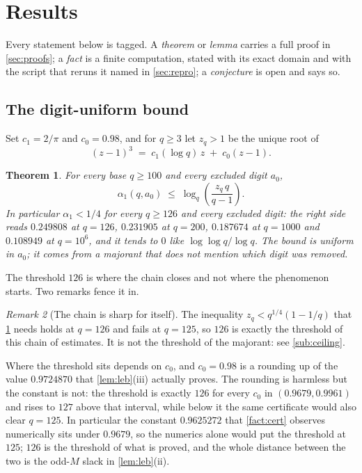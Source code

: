 \documentclass[11pt]{amsart}
\newtheorem{theorem}{Theorem}[section]
\theoremstyle{definition}
\theoremstyle{remark}
\newtheorem{remark}[theorem]{Remark}
\begin{document}
\section{Results}
\label{sec:results}

Every statement below is tagged. A \emph{theorem} or \emph{lemma} carries a full proof in \cref{sec:proofs}; a \emph{fact} is a finite computation, stated with its exact domain and with the script that reruns it named in \cref{sec:repro}; a \emph{conjecture} is open and says so.

\subsection{The digit-uniform bound}
\label{sub:uniform}

Set $c_{1} = 2/\pi$ and $c_{0} = 0.98$, and for $q \ge 3$ let $z_{q} > 1$ be the unique root of
\begin{equation}
\label{eq:cubic}
  (z-1)^{3} \;=\; c_{1}(\log q)\, z \;+\; c_{0}(z-1).
\end{equation}

\begin{theorem}
\label{thm:main}
For every base $q \ge 100$ and every excluded digit $a_{0}$,
\[
  \alpha_{1}(q, a_{0}) \;\le\; \log_{q}\!\left(\frac{z_{q}\, q}{q-1}\right).
\]
In particular $\alpha_{1} < 1/4$ for every $q \ge 126$ and every excluded digit: the right side reads $0.249808$ at $q = 126$, $0.231905$ at $q = 200$, $0.187674$ at $q = 1000$ and $0.108949$ at $q = 10^{6}$, and it tends to $0$ like $\log\log q/\log q$. The bound is uniform in $a_{0}$; it comes from a majorant that does not mention which digit was removed.
\end{theorem}

The threshold $126$ is where the chain closes and not where the phenomenon starts. Two remarks fence it in.

\begin{remark}[The chain is sharp for itself]
\label{rem:sharp126}
The inequality $z_{q} < q^{1/4}(1-1/q)$ that \cref{thm:main} needs holds at $q = 126$ and fails at $q = 125$, so $126$ is exactly the threshold of this chain of estimates. It is not the threshold of the majorant: see \cref{sub:ceiling}.

Where the threshold sits depends on $c_{0}$, and $c_{0} = 0.98$ is a rounding up of the value $0.9724870$ that \cref{lem:leb}(iii) actually proves. The rounding is harmless but the constant is not: the threshold is exactly $126$ for every $c_{0}$ in $(0.9679, 0.9961)$ and rises to $127$ above that interval, while below it the same certificate would also clear $q = 125$. In particular the constant $0.9625272$ that \cref{fact:cert} observes numerically sits under $0.9679$, so the numerics alone would put the threshold at $125$; $126$ is the threshold of what is proved, and the whole distance between the two is the odd-$M$ slack in \cref{lem:leb}(ii).
\end{remark}
\end{document}
